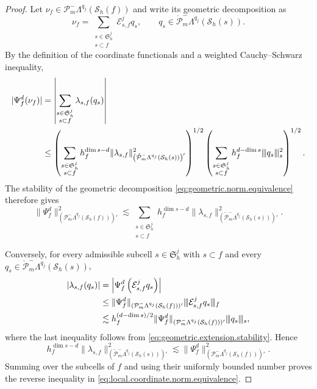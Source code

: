 \documentclass[10pt,a4paper]{amsart}
\newcommand{\PLtrim}[2]{\mathcal{P}_{#1}^{-}\Lambda^{#2}}
\newcommand{\PLtrimz}[2]{\mathring{\mathcal P}_{#1}^{-}\Lambda^{#2}}
\newcommand{\Sh}{\mathcal{S}_h}
\newcommand{\vvvert}{\vert\kern-0.25ex\vert\kern-0.25ex\vert}
\begin{document}
\begin{proof}
Let $\nu_f\in\PLtrim{m}{q_j}(\Sh(f))$ and write its geometric decomposition as
\[
\nu_f
=
\sum_{\substack{
s\in\mathfrak S_h^j\\
s\subset f
}}
\mathcal E_{s,f}^jq_s,
\qquad
q_s\in\PLtrimz{m}{q_j}(\Sh(s)).
\]
By the definition of the coordinate functionals and a weighted Cauchy--Schwarz inequality,
\[
\begin{aligned}
|\Psi_f^d(\nu_f)|
&=
\left|
\sum_{\substack{
s\in\mathfrak S_h^j\\
s\subset f
}}
\lambda_{s,f}(q_s)
\right|
\\
&\le
\left(
\sum_{\substack{
s\in\mathfrak S_h^j\\
s\subset f
}}
h_f^{\dim s-d}
\|\lambda_{s,f}\|_
{\left(\PLtrimz{m}{q_j}(\Sh(s))\right)'}^2
\right)^{1/2}
\left(
\sum_{\substack{
s\in\mathfrak S_h^j\\
s\subset f
}}
h_f^{d-\dim s}
\vvvert q_s\vvvert_s^2
\right)^{1/2}.
\end{aligned}
\]
The stability of the geometric decomposition \eqref{eq:geometric.norm.equivalence} therefore gives
\[
\|\Psi_f^d\|_{(\PLtrim{m}{q_j}(\Sh(f)))'}^2
\lesssim
\sum_{\substack{
s\in\mathfrak S_h^j\\
s\subset f
}}
h_f^{\dim s-d}
\|\lambda_{s,f}\|_
{\left(\PLtrimz{m}{q_j}(\Sh(s))\right)'}^2.
\]

Conversely, for every admissible subcell $s\in\mathfrak S_h^j$ with $s\subset f$ and every $q_s\in\PLtrimz{m}{q_j}(\Sh(s))$,
\[
\begin{aligned}
|\lambda_{s,f}(q_s)|
&=
\left|
\Psi_f^d
\left(
\mathcal E_{s,f}^jq_s
\right)
\right|
\\
&\le
\|\Psi_f^d\|_{(\PLtrim{m}{q_j}(\Sh(f)))'}
\vvvert
\mathcal E_{s,f}^jq_s
\vvvert_f
\\
&\lesssim
h_f^{(d-\dim s)/2}
\|\Psi_f^d\|_{(\PLtrim{m}{q_j}(\Sh(f)))'}
\vvvert q_s\vvvert_s,
\end{aligned}
\]
where the last inequality follows from \eqref{eq:geometric.extension.stability}.
Hence
\[
h_f^{\dim s-d}
\|\lambda_{s,f}\|_
{\left(\PLtrimz{m}{q_j}(\Sh(s))\right)'}^2
\lesssim
\|\Psi_f^d\|_{(\PLtrim{m}{q_j}(\Sh(f)))'}^2.
\]
Summing over the subcells of $f$ and using their uniformly bounded number proves the reverse inequality in \eqref{eq:local.coordinate.norm.equivalence}.


\end{proof}
\end{document}
